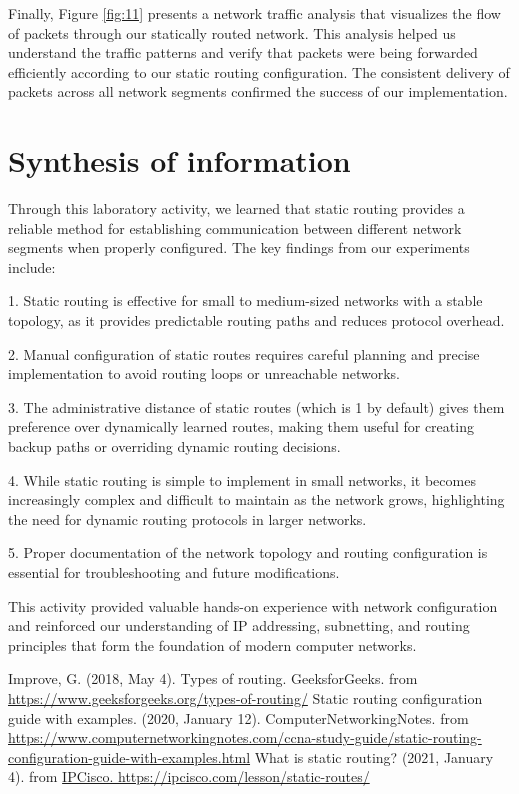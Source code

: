 \documentclass[twoside]{article}
\begin{document}
\begin{multicols}{2}
Finally, Figure \ref{fig:11} presents a network traffic analysis that visualizes the flow of packets through our statically routed network. This analysis helped us understand the traffic patterns and verify that packets were being forwarded efficiently according to our static routing configuration. The consistent delivery of packets across all network segments confirmed the success of our implementation.

\section{Synthesis of information}
Through this laboratory activity, we learned that static routing provides a reliable method for establishing communication between different network segments when properly configured. The key findings from our experiments include:

1. Static routing is effective for small to medium-sized networks with a stable topology, as it provides predictable routing paths and reduces protocol overhead.

2. Manual configuration of static routes requires careful planning and precise implementation to avoid routing loops or unreachable networks.

3. The administrative distance of static routes (which is 1 by default) gives them preference over dynamically learned routes, making them useful for creating backup paths or overriding dynamic routing decisions.

4. While static routing is simple to implement in small networks, it becomes increasingly complex and difficult to maintain as the network grows, highlighting the need for dynamic routing protocols in larger networks.

5. Proper documentation of the network topology and routing configuration is essential for troubleshooting and future modifications.

This activity provided valuable hands-on experience with network configuration and reinforced our understanding of IP addressing, subnetting, and routing principles that form the foundation of modern computer networks.

\begin{thebibliography}{9}
    Improve, G. (2018, May 4). Types of routing. GeeksforGeeks. from \url{https://www.geeksforgeeks.org/types-of-routing/}
    Static routing configuration guide with examples. (2020, January 12). ComputerNetworkingNotes.
    from \url{https://www.computernetworkingnotes.com/ccna-study-guide/static-routing-configuration-guide-with-examples.html}
    What is static routing? (2021, January 4). 
    from \url{IPCisco. https://ipcisco.com/lesson/static-routes/}
\end{thebibliography}

\end{multicols}
\end{document}

